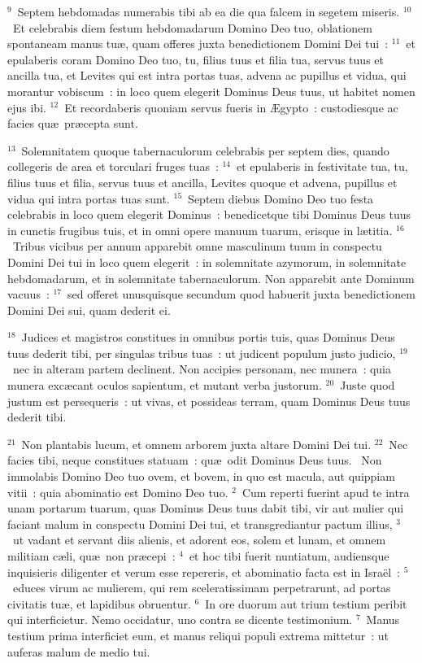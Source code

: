${}^{9}$~Septem hebdomadas numerabis tibi ab ea die qua falcem in segetem miseris.
${}^{10}$~Et celebrabis diem festum hebdomadarum Domino Deo tuo, oblationem spontaneam manus tu\ae , quam offeres juxta benedictionem Domini Dei tui~:
${}^{11}$~et epulaberis coram Domino Deo tuo, tu, filius tuus et filia tua, servus tuus et ancilla tua, et Levites qui est intra portas tuas, advena ac pupillus et vidua, qui morantur vobiscum~: in loco quem elegerit Dominus Deus tuus, ut habitet nomen ejus ibi.
${}^{12}$~Et recordaberis quoniam servus fueris in \AE gypto~: custodiesque ac facies qu\ae\ pr\ae cepta sunt.


${}^{13}$~Solemnitatem quoque tabernaculorum celebrabis per septem dies, quando collegeris de area et torculari fruges tuas~:
${}^{14}$~et epulaberis in festivitate tua, tu, filius tuus et filia, servus tuus et ancilla, Levites quoque et advena, pupillus et vidua qui intra portas tuas sunt.
${}^{15}$~Septem diebus Domino Deo tuo festa celebrabis in loco quem elegerit Dominus~: benedicetque tibi Dominus Deus tuus in cunctis frugibus tuis, et in omni opere manuum tuarum, erisque in l\ae titia.
${}^{16}$~Tribus vicibus per annum apparebit omne masculinum tuum in conspectu Domini Dei tui in loco quem elegerit~: in solemnitate azymorum, in solemnitate hebdomadarum, et in solemnitate tabernaculorum. Non apparebit ante Dominum vacuus~:
${}^{17}$~sed offeret unusquisque secundum quod habuerit juxta benedictionem Domini Dei sui, quam dederit ei.


${}^{18}$~Judices et magistros constitues in omnibus portis tuis, quas Dominus Deus tuus dederit tibi, per singulas tribus tuas~: ut judicent populum justo judicio,
${}^{19}$~nec in alteram partem declinent. Non accipies personam, nec munera~: quia munera exc\ae cant oculos sapientum, et mutant verba justorum.
${}^{20}$~Juste quod justum est persequeris~: ut vivas, et possideas terram, quam Dominus Deus tuus dederit tibi.


${}^{21}$~Non plantabis lucum, et omnem arborem juxta altare Domini Dei tui.
${}^{22}$~Nec facies tibi, neque constitues statuam~: qu\ae\ odit Dominus Deus tuus.
~Non immolabis Domino Deo tuo ovem, et bovem, in quo est macula, aut quippiam vitii~: quia abominatio est Domino Deo tuo.
${}^{2}$~Cum reperti fuerint apud te intra unam portarum tuarum, quas Dominus Deus tuus dabit tibi, vir aut mulier qui faciant malum in conspectu Domini Dei tui, et transgrediantur pactum illius,
${}^{3}$~ut vadant et servant diis alienis, et adorent eos, solem et lunam, et omnem militiam c\ae li, qu\ae\ non pr\ae cepi~:
${}^{4}$~et hoc tibi fuerit nuntiatum, audiensque inquisieris diligenter et verum esse repereris, et abominatio facta est in Isra\"el~:
${}^{5}$~educes virum ac mulierem, qui rem sceleratissimam perpetrarunt, ad portas civitatis tu\ae , et lapidibus obruentur.
${}^{6}$~In ore duorum aut trium testium peribit qui interficietur. Nemo occidatur, uno contra se dicente testimonium.
${}^{7}$~Manus testium prima interficiet eum, et manus reliqui populi extrema mittetur~: ut auferas malum de medio tui.


